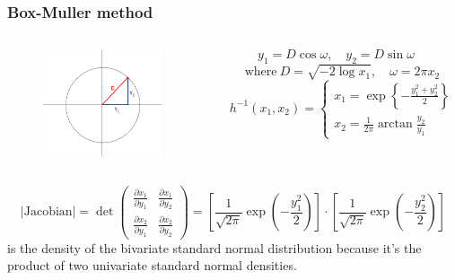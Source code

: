 \documentclass[10pt, serif, mathserif]{beamer}
\begin{document}
\begin{frame}
  \frametitle{Box-Muller method}
  \begin{columns}
    \begin{column}{3cm}
      \begin{figure}
        \centering
        \includegraphics[width=3.5cm,trim=10mm 10mm 10mm 10mm]{images/Picture1.png}
      \end{figure}
    \end{column}

    \begin{column}{5cm}
      \[ y_1 = D \cos \omega, \quad y_2 = D \sin \omega \quad \]
      \[ \text{where}\ D = \sqrt{-2 \log x_1}, \quad \omega = 2\pi x_2 \]
      \medskip
  \[
    h^{-1}(x_1,x_2) = \begin{cases}
      x_1 = \exp{\left\{ -\frac{y_1^2 + y_2^2}{2} \right\}}       
      \\
      x_2 = \frac{1}{2\pi} \arctan \frac{y_2}{y_1}
    \end{cases}
  \]
    \end{column}
  \end{columns}
  
  \bigskip
  
  \[
    \left|\text{Jacobian}\right| = \det \left(
  	  \begin{matrix}
  	    \frac{\partial x_1}{\partial y_1} & \frac{\partial x_1}{\partial y_2} \\
  	    \frac{\partial x_2}{\partial y_1} & \frac{\partial x_2}{\partial y_2} 
  	  \end{matrix}
  	\right) = 
  	\left[ 
  	  \frac{1}{\sqrt{2\pi}} \exp{\left(-\frac{y_1^2}{2}\right)}
  	\right]
  	\cdot
  	\left[
  	  \frac{1}{\sqrt{2\pi}} \exp{\left(-\frac{y_2^2}{2}\right)} 
  	\right]
  \]
  is the density of the bivariate standard normal distribution because it's the product of two univariate standard normal densities.
\end{frame}
\end{document}
